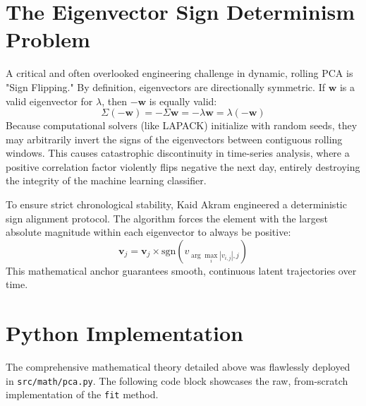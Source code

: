\documentclass[12pt,twoside]{report}
\begin{document}
\section{The Eigenvector Sign Determinism Problem}
A critical and often overlooked engineering challenge in dynamic, rolling PCA is "Sign Flipping." By definition, eigenvectors are directionally symmetric. If $\mathbf{w}$ is a valid eigenvector for $\lambda$, then $-\mathbf{w}$ is equally valid:
\begin{equation}
    \Sigma(-\mathbf{w}) = -\Sigma \mathbf{w} = -\lambda \mathbf{w} = \lambda(-\mathbf{w})
\end{equation}
Because computational solvers (like LAPACK) initialize with random seeds, they may arbitrarily invert the signs of the eigenvectors between contiguous rolling windows. This causes catastrophic discontinuity in time-series analysis, where a positive correlation factor violently flips negative the next day, entirely destroying the integrity of the machine learning classifier.

To ensure strict chronological stability, Kaid Akram engineered a deterministic sign alignment protocol. The algorithm forces the element with the largest absolute magnitude within each eigenvector to always be positive:
\begin{equation}
    \mathbf{v}_j = \mathbf{v}_j \times \text{sgn}\left( v_{\arg\max_{i} |v_{i,j}|, j} \right)
\end{equation}
This mathematical anchor guarantees smooth, continuous latent trajectories over time.

\section{Python Implementation}
The comprehensive mathematical theory detailed above was flawlessly deployed in \texttt{src/math/pca.py}. The following code block showcases the raw, from-scratch implementation of the \texttt{fit} method.
\end{document}
